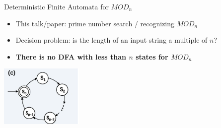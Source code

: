 \documentclass[aspectratio=169,9pt]{beamer}
\begin{document}
\begin{frame}[t]{Deterministic Finite Automata for $MOD_n$}
  \begin{itemize}
    \item This talk/paper: prime number search / recognizing $MOD_n$  
    \item Decision problem: is the length of an input string a multiple of $n$?
    \item \textbf{There is no DFA with less than $n$ states for $MOD_n$}
  \end{itemize}
  \vspace*{2em}
  \begin{center}
    \includegraphics[width=0.3\textwidth]{QFA_MODn.png}\\
  \end{center}
\end{frame}
\end{document}
